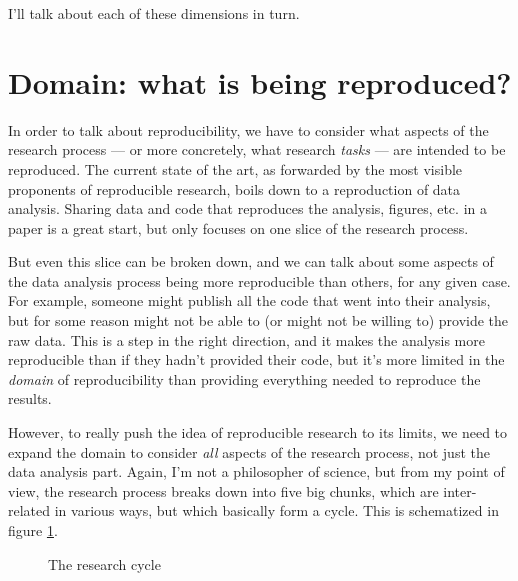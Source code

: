 \documentclass{book}
\begin{document}
I'll talk about each of these dimensions in turn.
\section{Domain: what is being reproduced?}
\label{sec-3-1}
\label{domain}

In order to talk about reproducibility, we have to consider what aspects of the research process --- or more concretely, what research \emph{tasks} --- are intended to be reproduced.  The current state of the art, as forwarded by the most visible proponents of reproducible research, boils down to a reproduction of data analysis. Sharing data and code that reproduces the analysis, figures, etc. in a paper is a great start, but only focuses on one slice of the research process.

But even this slice can be broken down, and we can talk about some aspects of the data analysis process being more reproducible than others, for any given case.  For example, someone might publish all the code that went into their analysis, but for some reason might not be able to (or might not be willing to) provide the raw data. This is a step in the right direction, and it makes the analysis more reproducible than if they hadn't provided their code, but it's more limited in the \emph{domain} of reproducibility than providing everything needed to reproduce the results.

However, to really push the idea of reproducible research to its limits, we need to expand the domain to consider \emph{all} aspects of the research process, not just the data analysis part.  Again, I'm not a philosopher of science, but from my point of view, the research process breaks down into five big chunks, which are inter-related in various ways, but which basically form a cycle.  This is schematized in figure \ref{rescycle}.  

  \begin{figure}[h]
  \caption{The research cycle}
  \centering
  \label{rescycle}
  \end{figure}
\end{document}

